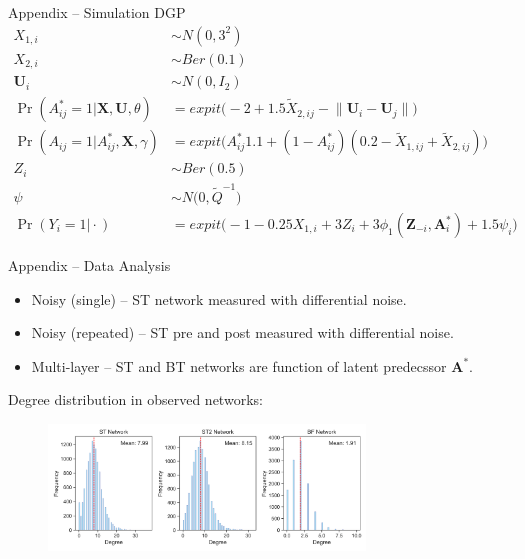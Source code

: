 \documentclass{beamer}
\def \bZ {\textbf{Z}}
\def \bA {\textbf{A}}
\def \bX {\textbf{X}}
\def \bU {\textbf{U}}
\begin{document}
    \begin{frame}{Appendix -- Simulation DGP}
        \begin{equation*}
            \begin{aligned}
                X_{1,i} &\sim N(0,3^2) \\
                X_{2,i} &\sim Ber(0.1) \\
                \bU_i &\sim N(0,I_2) \\ 
                \Pr(A^\ast_{ij}=1 \vert \bX,\bU,\theta) &= expit\big(-2 +  1.5\widetilde{X}_{2,ij} - \lVert \bU_i - \bU_j \rVert \big ) \\
                \Pr(A_{ij}=1 \vert A^\ast_{ij}, \bX, \gamma) &= expit\big(A^\ast_{ij}1.1 + (1-A^\ast_{ij})(0.2 - \widetilde{X}_{1,ij} + \widetilde{X}_{2,ij})\big) \\
                Z_i &\sim Ber(0.5) \\
                \psi &\sim N\Big(0, \widetilde{Q}^{-1}\Big) \\
                \Pr(Y_i=1 \vert \cdot) &= expit\big(-1 - 0.25X_{1,i} + 3Z_i + 3 \phi_1(\bZ_{-i},\bA^\ast_i) + 1.5 \psi_i \big) 
            \end{aligned}
        \end{equation*}
    \end{frame}

    \begin{frame}{Appendix -- Data Analysis}
        \begin{itemize}
            \item Noisy (single) -- ST network measured with differential noise.
            \item Noisy (repeated) -- ST pre and post measured with differential noise. 
            \item Multi-layer -- ST and BT networks are function of latent predecssor $\bA^\ast$.
        \end{itemize}
        Degree distribution in observed networks:
        \begin{figure}
            \centering
            \includegraphics[width=0.75\textwidth]{figs/data_degree_dist.png}
        \end{figure}
    \end{frame}
\end{document}
